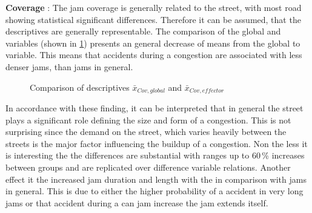 \textbf{Coverage} : The jam coverage is generally related to the street, with most road showing statistical significant differences. Therefore it can be assumed, that the descriptives are generally representable. The comparison of the global and  variables (shown in \cref{fig:baysis_summary_Str_coverage_barplot}) presents an general decrease of means from the global to  variable. This means that accidents during a congestion are associated with less denser jams, than jams in general.
\begin{figure}[ht!]
    \data
    \pgfplotstablesort[sort key=means, sort cmp=float >]{\datasorted}{\data}
    \tiny
    \centering
    \caption{Comparison of descriptives $\bar{x}_{Cov,global}$ and $\bar{x}_{Cov,effector}$}
    \label{fig:baysis_summary_Str_coverage_barplot}
\end{figure}
In accordance with these finding, it can be interpreted that in general the street plays a significant role defining the size and form of a congestion. This is not surprising since the demand on the street, which varies heavily between the streets is the major factor influencing the buildup of a congestion. Non the less it is interesting the the differences are substantial with ranges up to 60\,\% increases between groups and are replicated over difference variable relations. Another effect it the increased jam duration and length with the  in comparison with jams in general. This is due to either the higher probability of a accident in very long jams or that accident during a can jam increase the jam extends itself.

